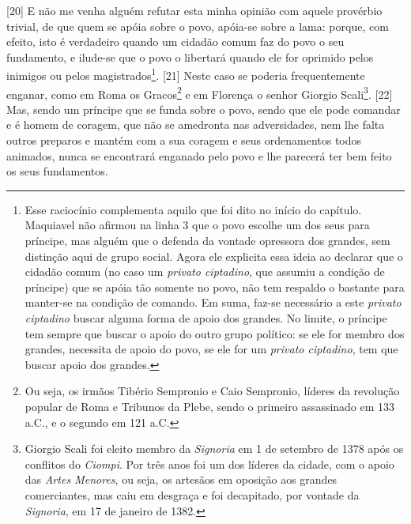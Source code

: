 {[}20{]} E não me venha alguém refutar esta minha opinião com aquele
provérbio trivial, de que quem se apóia sobre o povo, apóia-se sobre a
lama: porque, com efeito, isto é verdadeiro quando um cidadão comum faz
do povo o seu fundamento, e ilude-se que o povo o libertará quando ele
for oprimido pelos inimigos ou pelos magistrados\footnote{Esse
  raciocínio complementa aquilo que foi dito no início do capítulo.
  Maquiavel não afirmou na linha 3 que o povo escolhe um dos seus para
  príncipe, mas alguém que o defenda da vontade opressora dos grandes,
  sem distinção aqui de grupo social. Agora ele explicita essa ideia ao
  declarar que o cidadão comum (no caso um \emph{privato ciptadino}, que
  assumiu a condição de príncipe) que se apóia tão somente no povo, não
  tem respaldo o bastante para manter-se na condição de comando. Em
  suma, faz-se necessário a este \emph{privato ciptadino} buscar alguma
  forma de apoio dos grandes. No limite, o príncipe tem sempre que
  buscar o apoio do outro grupo político: se ele for membro dos grandes,
  necessita de apoio do povo, se ele for um \emph{privato ciptadino},
  tem que buscar apoio dos grandes.}. {[}21{]} Neste caso se poderia
frequentemente enganar, como em Roma os Gracos\footnote{Ou seja, os
  irmãos Tibério Sempronio e Caio Sempronio, líderes da revolução
  popular de Roma e Tribunos da Plebe, sendo o primeiro assassinado em
  133 a.C., e o segundo em 121 a.C.} e em Florença o senhor Giorgio
Scali\footnote{Giorgio Scali foi eleito membro da \emph{Signoria} em 1
  de setembro de 1378 após os conflitos do \emph{Ciompi}. Por três anos
  foi um dos líderes da cidade, com o apoio das \emph{Artes Menores}, ou
  seja, os artesãos em oposição aos grandes comerciantes, mas caiu em
  desgraça e foi decapitado, por vontade da \emph{Signoria}, em 17 de
  janeiro de 1382.}. {[}22{]} Mas, sendo um príncipe que se funda sobre
o povo, sendo que ele pode comandar e é homem de coragem, que não se
amedronta nas adversidades, nem lhe falta outros preparos e mantém com a
sua coragem e seus ordenamentos todos animados, nunca se encontrará
enganado pelo povo e lhe parecerá ter bem feito os seus fundamentos.

